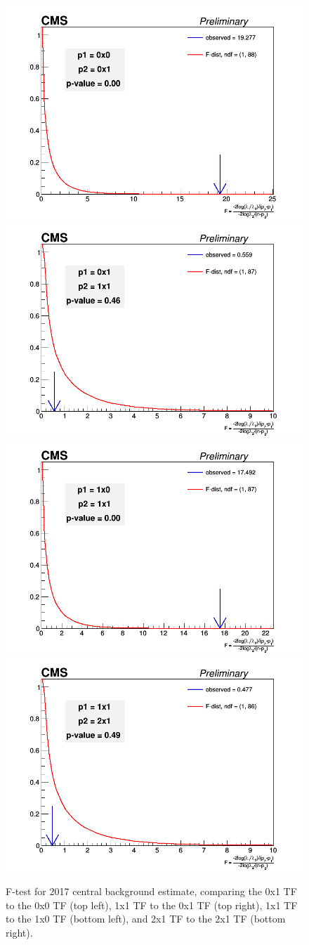             


            \begin{figure}[!htbp]
                \begin{center}
                \includegraphics[width=0.4\linewidth]{Plots/tests/ftest_cen_0x0_vs_0x1_2017.png}
                \includegraphics[width=0.4\linewidth]{Plots/tests/ftest_cen_0x1_vs_1x1_2017.png}
                \includegraphics[width=0.4\linewidth]{Plots/tests/ftest_cen_1x0_vs_1x1_2017.png}
                \includegraphics[width=0.4\linewidth]{Plots/tests/ftest_cen_1x1_vs_2x1_2017.png}
    
                    \caption{F-test for 2017 central background estimate, comparing the 0x1 TF to the 0x0 TF (top left), 1x1 TF to the 0x1 TF (top right), 1x1 TF to the 1x0 TF (bottom left), and 2x1 TF to the 2x1 TF (bottom right).}
                    \label{fig:ftest17}
                \end{center}
            \end{figure}
            

